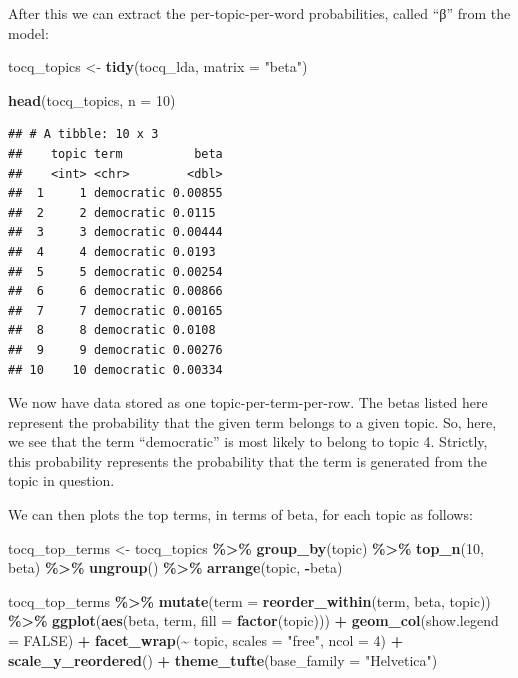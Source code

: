 \documentclass[
]{article}
\newenvironment{Shaded}{\begin{snugshade}}{\end{snugshade}}
\newcommand{\AttributeTok}[1]{\textcolor[rgb]{0.13,0.29,0.53}{#1}}
\newcommand{\ConstantTok}[1]{\textcolor[rgb]{0.56,0.35,0.01}{#1}}
\newcommand{\DecValTok}[1]{\textcolor[rgb]{0.00,0.00,0.81}{#1}}
\newcommand{\FunctionTok}[1]{\textcolor[rgb]{0.13,0.29,0.53}{\textbf{#1}}}
\newcommand{\NormalTok}[1]{#1}
\newcommand{\OtherTok}[1]{\textcolor[rgb]{0.56,0.35,0.01}{#1}}
\newcommand{\SpecialCharTok}[1]{\textcolor[rgb]{0.81,0.36,0.00}{\textbf{#1}}}
\newcommand{\StringTok}[1]{\textcolor[rgb]{0.31,0.60,0.02}{#1}}
\begin{document}
After this we can extract the per-topic-per-word probabilities, called
``β'' from the model:

\begin{Shaded}
\begin{Highlighting}[]
\NormalTok{tocq\_topics }\OtherTok{\textless{}{-}} \FunctionTok{tidy}\NormalTok{(tocq\_lda, }\AttributeTok{matrix =} \StringTok{"beta"}\NormalTok{)}

\FunctionTok{head}\NormalTok{(tocq\_topics, }\AttributeTok{n =} \DecValTok{10}\NormalTok{)}
\end{Highlighting}
\end{Shaded}

\begin{verbatim}
## # A tibble: 10 x 3
##    topic term          beta
##    <int> <chr>        <dbl>
##  1     1 democratic 0.00855
##  2     2 democratic 0.0115 
##  3     3 democratic 0.00444
##  4     4 democratic 0.0193 
##  5     5 democratic 0.00254
##  6     6 democratic 0.00866
##  7     7 democratic 0.00165
##  8     8 democratic 0.0108 
##  9     9 democratic 0.00276
## 10    10 democratic 0.00334
\end{verbatim}

We now have data stored as one topic-per-term-per-row. The betas listed
here represent the probability that the given term belongs to a given
topic. So, here, we see that the term ``democratic'' is most likely to
belong to topic 4. Strictly, this probability represents the probability
that the term is generated from the topic in question.

We can then plots the top terms, in terms of beta, for each topic as
follows:

\begin{Shaded}
\begin{Highlighting}[]
\NormalTok{tocq\_top\_terms }\OtherTok{\textless{}{-}}\NormalTok{ tocq\_topics }\SpecialCharTok{\%\textgreater{}\%}
  \FunctionTok{group\_by}\NormalTok{(topic) }\SpecialCharTok{\%\textgreater{}\%}
  \FunctionTok{top\_n}\NormalTok{(}\DecValTok{10}\NormalTok{, beta) }\SpecialCharTok{\%\textgreater{}\%}
  \FunctionTok{ungroup}\NormalTok{() }\SpecialCharTok{\%\textgreater{}\%}
  \FunctionTok{arrange}\NormalTok{(topic, }\SpecialCharTok{{-}}\NormalTok{beta)}

\NormalTok{tocq\_top\_terms }\SpecialCharTok{\%\textgreater{}\%}
  \FunctionTok{mutate}\NormalTok{(}\AttributeTok{term =} \FunctionTok{reorder\_within}\NormalTok{(term, beta, topic)) }\SpecialCharTok{\%\textgreater{}\%}
  \FunctionTok{ggplot}\NormalTok{(}\FunctionTok{aes}\NormalTok{(beta, term, }\AttributeTok{fill =} \FunctionTok{factor}\NormalTok{(topic))) }\SpecialCharTok{+}
  \FunctionTok{geom\_col}\NormalTok{(}\AttributeTok{show.legend =} \ConstantTok{FALSE}\NormalTok{) }\SpecialCharTok{+}
  \FunctionTok{facet\_wrap}\NormalTok{(}\SpecialCharTok{\textasciitilde{}}\NormalTok{ topic, }\AttributeTok{scales =} \StringTok{"free"}\NormalTok{, }\AttributeTok{ncol =} \DecValTok{4}\NormalTok{) }\SpecialCharTok{+}
  \FunctionTok{scale\_y\_reordered}\NormalTok{() }\SpecialCharTok{+}
  \FunctionTok{theme\_tufte}\NormalTok{(}\AttributeTok{base\_family =} \StringTok{"Helvetica"}\NormalTok{)}
\end{Highlighting}
\end{Shaded}
\end{document}

